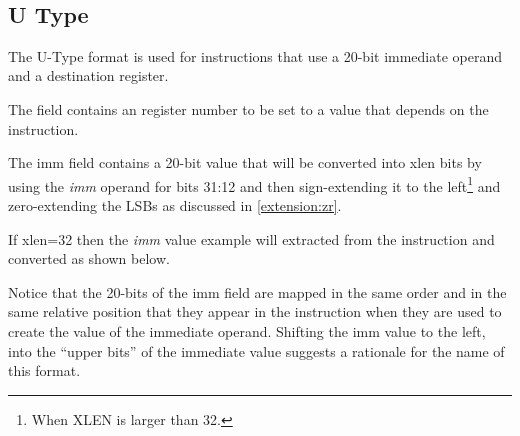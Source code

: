 \begin{figure}[ht]
\\
\\
\\
\\
\\
\\
\label{Figure:riscvFormats}
\end{figure}

\subsection{U Type}
\label{insnformat:utype}

The U-Type format is used for instructions that use a 20-bit immediate operand 
and a destination register.
 

The  field contains an  register number to be set to a value that
depends on the instruction.

The imm field 
contains a 20-bit value that will be converted into \Gls{xlen} bits by 
using the {\em imm} operand for bits 31:12 and then sign-extending it 
to the left\footnote{When XLEN is larger than 32.} and zero-extending 
the LSBs as discussed in \autoref{extension:zr}.

If \Gls{xlen}=32 then the {\em imm} value example will extracted from the instruction
and converted as shown below.

\label{imm.u:decode}\DrawInsnOpUTypeDecoding

%

Notice that the 20-bits of the imm field are mapped in the same order and 
in the same relative position that they appear in the instruction when 
they are used to create the value of the immediate operand.  
Shifting the imm value to the left, into the ``upper bits'' of the immediate 
value suggests a rationale for the name of this format.

